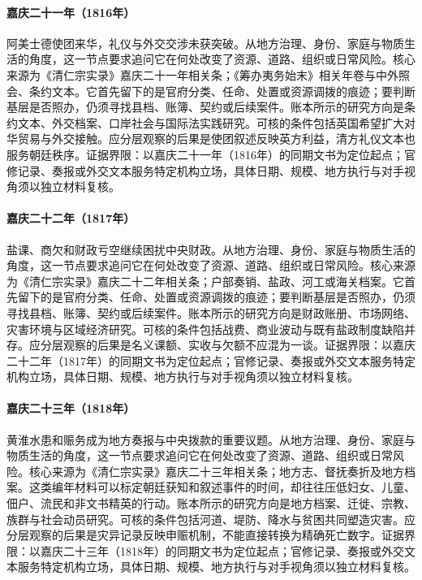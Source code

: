 \hypertarget{social:EQ-1816-AMHERST-MISSION}{}\paragraph{嘉庆二十一年（1816年）}阿美士德使团来华，礼仪与外交交涉未获突破。从地方治理、身份、家庭与物质生活的角度，这一节点要求追问它在何处改变了资源、道路、组织或日常风险。核心来源为《清仁宗实录》嘉庆二十一年相关条；《筹办夷务始末》相关年卷与中外照会、条约文本。它首先留下的是官府分类、任命、处置或资源调拨的痕迹；要判断基层是否照办，仍须寻找县档、账簿、契约或后续案件。账本所示的研究方向是条约文本、外交档案、口岸社会与国际法实践研究。可核的条件包括英国希望扩大对华贸易与外交接触。应分层观察的后果是使团叙述反映英方利益，清方礼仪文本也服务朝廷秩序。证据界限：以嘉庆二十一年（1816年）的同期文书为定位起点；官修记录、奏报或外交文本服务特定机构立场，具体日期、规模、地方执行与对手视角须以独立材料复核。
\hypertarget{social:EQ-1817-SALT-ARREARS}{}\paragraph{嘉庆二十二年（1817年）}盐课、商欠和财政亏空继续困扰中央财政。从地方治理、身份、家庭与物质生活的角度，这一节点要求追问它在何处改变了资源、道路、组织或日常风险。核心来源为《清仁宗实录》嘉庆二十二年相关条；户部奏销、盐政、河工或海关档案。它首先留下的是官府分类、任命、处置或资源调拨的痕迹；要判断基层是否照办，仍须寻找县档、账簿、契约或后续案件。账本所示的研究方向是财政账册、市场网络、灾害环境与区域经济研究。可核的条件包括战费、商业波动与既有盐政制度缺陷并存。应分层观察的后果是名义课额、实收与欠额不应混为一谈。证据界限：以嘉庆二十二年（1817年）的同期文书为定位起点；官修记录、奏报或外交文本服务特定机构立场，具体日期、规模、地方执行与对手视角须以独立材料复核。
\hypertarget{social:EQ-1818-FLOOD-RELIEF}{}\paragraph{嘉庆二十三年（1818年）}黄淮水患和赈务成为地方奏报与中央拨款的重要议题。从地方治理、身份、家庭与物质生活的角度，这一节点要求追问它在何处改变了资源、道路、组织或日常风险。核心来源为《清仁宗实录》嘉庆二十三年相关条；地方志、督抚奏折及地方档案。这类编年材料可以标定朝廷获知和叙述事件的时间，却往往压低妇女、儿童、佃户、流民和非文书精英的行动。账本所示的研究方向是地方档案、迁徙、宗教、族群与社会动员研究。可核的条件包括河道、堤防、降水与贫困共同塑造灾害。应分层观察的后果是灾异记录反映申赈机制，不能直接转换为精确死亡数字。证据界限：以嘉庆二十三年（1818年）的同期文书为定位起点；官修记录、奏报或外交文本服务特定机构立场，具体日期、规模、地方执行与对手视角须以独立材料复核。
